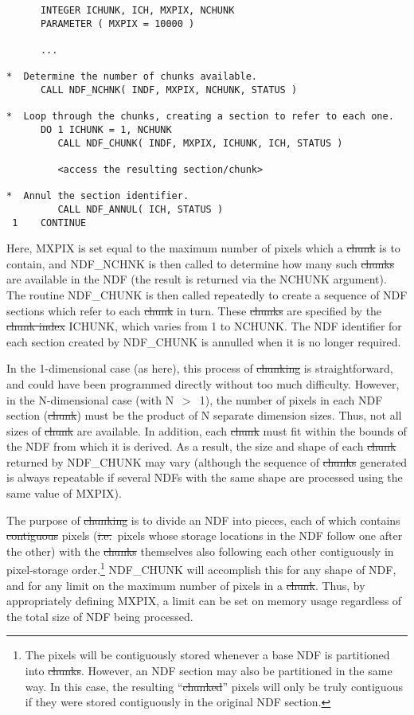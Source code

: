 \small
\begin{verbatim}
      INTEGER ICHUNK, ICH, MXPIX, NCHUNK
      PARAMETER ( MXPIX = 10000 )

      ...

*  Determine the number of chunks available.
      CALL NDF_NCHNK( INDF, MXPIX, NCHUNK, STATUS )

*  Loop through the chunks, creating a section to refer to each one.
      DO 1 ICHUNK = 1, NCHUNK
         CALL NDF_CHUNK( INDF, MXPIX, ICHUNK, ICH, STATUS )

         <access the resulting section/chunk>

*  Annul the section identifier.
         CALL NDF_ANNUL( ICH, STATUS )
 1    CONTINUE
\end{verbatim}
\normalsize

Here, MXPIX is set equal to the maximum number of pixels which a
\st{chunk\/} is to contain, and NDF\_NCHNK is then called to determine
how 
many such \st{chunks\/} are available in the NDF (the result is
returned via the NCHUNK argument). The routine NDF\_CHUNK is then
called repeatedly to create a sequence of NDF sections which refer to
each \st{chunk\/} in turn. These \st{chunks\/} are specified by the
\st{chunk index\/} ICHUNK, which varies from 1 to NCHUNK. The NDF
identifier for each section created by NDF\_CHUNK is annulled when it is
no longer required.

In the 1-dimensional case (as here), this process of \st{chunking\/} is
straightforward, and could have been programmed directly without too
much difficulty. However, in the N-dimensional case (with N~$>$~1), the
number of pixels in each NDF section (\st{chunk\/}) must be the product
of N separate dimension sizes. Thus, not all sizes of \st{chunk\/} are
available. In addition, each \st{chunk\/} must fit within the bounds of
the NDF from which it is derived. As a result, the size and shape of
each \st{chunk\/} returned by NDF\_CHUNK may vary (although the sequence of
\st{chunks\/} generated is always repeatable if several NDFs with the same
shape are processed using the same value of MXPIX).

The purpose of \st{chunking\/} is to divide an NDF into pieces, each of which
contains \st{contiguous\/} pixels (\st{i.e.}\ pixels whose storage locations
in the NDF follow one after the other) with the \st{chunks\/} themselves also
following each other contiguously in pixel-storage order.\footnote{The pixels
will be contiguously stored whenever a base NDF is partitioned into \st{chunks}. However, an NDF section may also be partitioned in the same way. In
this case, the resulting ``\st{chunked\/}'' pixels will only be truly
contiguous if they were stored contiguously in the original NDF section.}
NDF\_CHUNK will accomplish this for any shape of NDF, and for any limit on the
maximum number of pixels in a \st{chunk}. Thus, by appropriately defining
MXPIX, a limit can be set on memory usage regardless of the total size of NDF
being processed.

